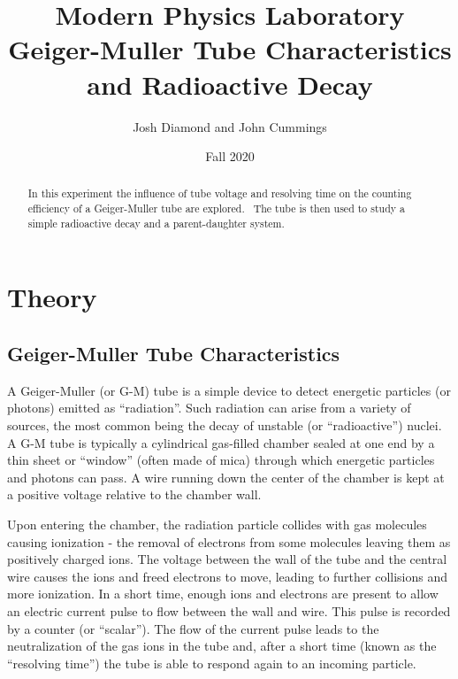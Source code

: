 \documentclass{article}
\begin{document}
\title{Modern Physics Laboratory\\
Geiger-Muller Tube Characteristics and Radioactive Decay}
\author{Josh Diamond and John Cummings}
\date{Fall 2020}
\maketitle

\begin{abstract}
In this experiment the influence of tube voltage and resolving time on
the counting efficiency of a Geiger-Muller tube are explored. \ The
tube is then used to study a simple radioactive decay and a
parent-daughter system.
\end{abstract}

\section{Theory}

\subsection{Geiger-Muller Tube Characteristics}
\label{sec:GMtubes}

A Geiger-Muller (or G-M) tube is a simple device to detect energetic
particles (or photons) emitted as
``radiation''.  Such radiation can arise
from a variety of sources, the most common being the decay of unstable
(or ``radioactive'') nuclei. A G-M tube is
typically a cylindrical gas-filled chamber sealed at one end by a thin
sheet or ``window'' (often made of mica)
through which energetic particles and photons can pass. A wire running
down the center of the chamber is kept at a positive voltage relative
to the chamber wall.

Upon entering the chamber, the radiation particle collides with gas
molecules causing ionization - the removal of electrons from some
molecules leaving them as positively charged ions.  The voltage
between the wall of the tube and the central wire causes the ions and
freed electrons to move, leading to further collisions and more
ionization.  In a short time, enough ions and electrons are present to
allow an electric current pulse to flow between the wall and wire.
 This pulse is recorded by a counter (or
``scalar''). The flow of the current pulse
leads to the neutralization of the
gas ions in the tube and, after a short time (known as the
``resolving time'') the tube is able to
respond again to an incoming particle.
\end{document}
